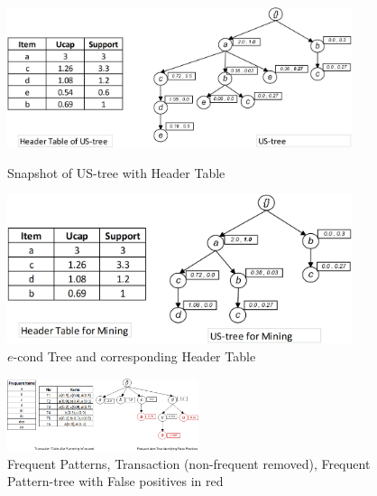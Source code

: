 \documentclass[conference]{IEEEtran}
\begin{document}
\begin{figure}[t]
    \begin{minipage}{0.5\linewidth}
    \centering
	\includegraphics[width=0.9\textwidth]{visio/us_tree}  
	\caption{Snapshot of US-tree with Header Table}%
	\label{figure:US_TREE_HEADER_TABLE}
    \end{minipage}%
    \begin{minipage}{0.5\linewidth}
    \centering
	\includegraphics[width=0.9\textwidth]{visio/M_TREE}  
	\caption{$e$-cond Tree and corresponding Header Table}%
	\label{figure:E_COND_TREE_HEADER_TABLE}
    \end{minipage}
\end{figure}

\begin{figure}[t]
    \centering
	\includegraphics[width=0.5\textwidth]{visio/frequent_tree_final_ex}  
	\caption{Frequent Patterns, Transaction (non-frequent removed), Frequent Pattern-tree with False positives in red}%
	\label{figure:FALSE_NEGATIVE}
\end{figure}
\end{document}
